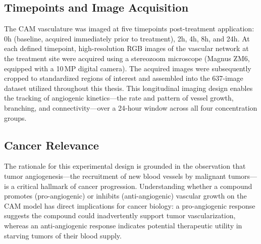 \subsection{Timepoints and Image Acquisition}
The CAM vasculature was imaged at five timepoints post-treatment application: 0h (baseline, acquired immediately prior to treatment), 2h, 4h, 8h, and 24h. At each defined timepoint, high-resolution RGB images of the vascular network at the treatment site were acquired using a stereozoom microscope (Magnus ZM6, equipped with a 10\,MP digital camera). The acquired images were subsequently cropped to standardized regions of interest and assembled into the 637-image dataset utilized throughout this thesis. This longitudinal imaging design enables the tracking of angiogenic kinetics---the rate and pattern of vessel growth, branching, and connectivity---over a 24-hour window across all four concentration groups.

\subsection{Cancer Relevance}
The rationale for this experimental design is grounded in the observation that tumor angiogenesis---the recruitment of new blood vessels by malignant tumors---is a critical hallmark of cancer progression. Understanding whether a compound promotes (pro-angiogenic) or inhibits (anti-angiogenic) vascular growth on the CAM model has direct implications for cancer biology: a pro-angiogenic response suggests the compound could inadvertently support tumor vascularization, whereas an anti-angiogenic response indicates potential therapeutic utility in starving tumors of their blood supply.
